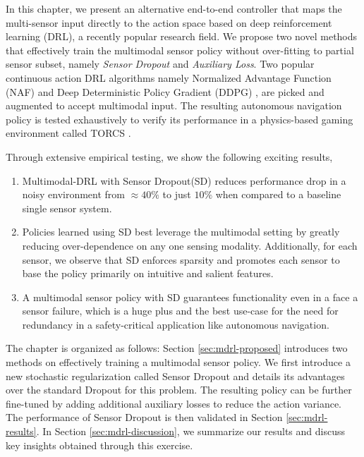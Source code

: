 \documentclass[../thesis.tex]{subfiles}
\begin{document}
 
In this chapter, we present an alternative end-to-end controller that maps the multi-sensor input directly to the action space based on deep reinforcement learning (DRL), a recently popular research field.
We propose two novel methods that effectively train the multimodal sensor policy without over-fitting to partial sensor subset, namely \textit{Sensor Dropout} and \textit{Auxiliary Loss}.
Two popular continuous action DRL algorithms namely Normalized Advantage Function (NAF) \cite{CDQN} and Deep Deterministic Policy Gradient (DDPG) \cite{DBLP:journals/corr/LillicrapHPHETS15}, are picked and augmented to accept multimodal input. The resulting autonomous navigation policy is tested exhaustively to verify its performance in a physics-based gaming environment called TORCS \cite{wymann2000torcs}.
 
Through extensive empirical testing, we show the following exciting results,
\begin{enumerate}
 
        \item Multimodal-DRL with Sensor Dropout(SD) reduces performance drop in a noisy environment from $\approx 40\%$ to just $10\%$ when compared to a baseline single sensor system.
        
        \item Policies learned using SD best leverage the multimodal setting by greatly reducing over-dependence on any one sensing modality. Additionally, for each sensor, we observe that SD enforces sparsity and promotes each sensor to base the policy primarily on intuitive and salient features.
        
        \item A multimodal sensor policy with SD guarantees functionality even in a face a sensor failure, which is a huge plus and the best use-case for the need for redundancy in a safety-critical application like autonomous navigation.
 
\end{enumerate}
 
 
The chapter is organized as follows:
Section \ref{sec:mdrl-proposed} introduces two methods on effectively training a multimodal sensor policy. We first introduce a new stochastic regularization called Sensor Dropout and details its advantages over the standard Dropout for this problem. The resulting policy can be further fine-tuned by adding additional auxiliary losses to reduce the action variance. The performance of Sensor Dropout is then validated in Section \ref{sec:mdrl-results}. In Section \ref{sec:mdrl-discussion}, we summarize our results and discuss key insights obtained through this exercise.
 
\end{document}
